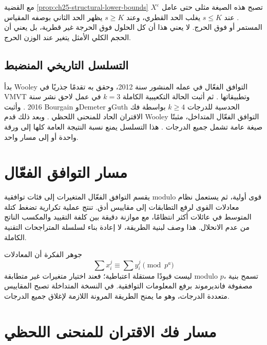 مع القضية \ref{prop:ch25-structural-lower-bounds} تصبح هذه الصيغة مثلى حتى عامل \(X^\varepsilon\). عند \(s\le K\) يغلب الحد القطري، وعند \(s\ge K\) يظهر الحد الثاني بوصفه المقياس المستمر أو فوق الحرج. لا يعني هذا أن كل الحلول فوق الحرجة غير قطرية، بل يعني أن الحجم الكلي الأمثل يتغير عند الوزن الحرج.

\subsection*{التسلسل التاريخي المنضبط}

بدأ Wooley التوافق الفعّال في عمله المنشور سنة 2012، وحقق به تقدمًا جذريًا في VMVT وتطبيقاتها \cite{wooley2012efficient}. ثم أثبت الحالة التكعيبية الكاملة \(k=3\) في عمل لاحق نشر سنة 2016 \cite{wooley2016cubic}. وأثبت Bourgain وDemeter وGuth الحدسية للدرجات \(k\ge4\) بواسطة فك الاقتران الحاد للمنحنى اللحظي \cite{bourgainDemeterGuth2016vmvt}. وبعد ذلك قدم Wooley التوافق الفعّال المتداخل، مثبتًا صيغة عامة تشمل جميع الدرجات \cite{wooley2019nested}. هذا التسلسل يمنع نسبة النتيجة العامة كلها إلى ورقة واحدة أو إلى مسار واحد.

\section{مسار التوافق الفعّال}

\begin{remark}
\label{rem:ch25-efficient-congruencing-principle}
يقسم التوافق الفعّال المتغيرات إلى فئات توافقية modulo قوى أولية، ثم يستعمل نظام معادلات القوى لرفع التطابقات إلى مقاييس أدق. تنتج عملية تكرارية تضغط كتلة المتوسط في عائلات أكثر انتظامًا، مع موازنة دقيقة بين كلفة التقييد والمكسب الناتج من عدم الانحلال. هذا وصف لبنية الطريقة، لا إعادة بناء لسلسلة المتراجحات التقنية الكاملة.
\end{remark}

جوهر الفكرة أن المعادلات
\[
\sum x_i^j\equiv\sum y_i^j\pmod{p^a}
\]
ليست قيودًا مستقلة اعتباطية؛ فعند اختيار متغيرات غير متطابقة modulo \(p\)، تسمح بنية مصفوفة فانديرموند برفع المعلومات التوافقية. في النسخة المتداخلة تصبح المقاييس متعددة الدرجات، وهو ما يمنح الطريقة المرونة اللازمة لإغلاق جميع الدرجات.

\section{مسار فك الاقتران للمنحنى اللحظي}

